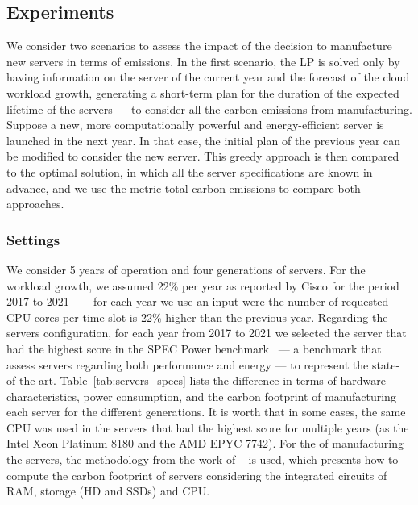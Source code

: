 \subsection{Experiments}


We consider two scenarios to assess the impact of the decision to manufacture new servers in terms of  emissions. In the first scenario, the LP is solved only by having information on the server of the current year and the forecast of the cloud workload growth, generating a short-term plan for the duration of the expected lifetime of the servers --- to consider all the carbon emissions from manufacturing. Suppose a new, more computationally powerful and energy-efficient server is launched in the next year. In that case, the initial plan of the previous year can be modified to consider the new server. This greedy approach is then compared to the optimal solution, in which all the server specifications are known in advance, and we use the metric total carbon emissions to compare both approaches.



\subsubsection{Settings}


We consider 5 years of operation and four generations of servers. For the workload growth, we assumed 22\% per year as reported by Cisco for the period 2017 to 2021~\cite{cisco_global_cloud_index_2018} --- for each year we use an input were the number of requested CPU cores per time slot is 22\% higher than the previous year. Regarding the servers configuration, for each year from 2017 to 2021 we selected the server that had the highest score in the SPEC Power benchmark~\cite{spec_power} --- a benchmark that assess servers regarding both performance and energy --- to represent the state-of-the-art. Table~\ref{tab:servers_specs} lists the difference in terms of hardware characteristics, power consumption, and the carbon footprint of manufacturing each server for the different generations.  It is worth  that in some cases, the same CPU was used in the servers that had the highest score for multiple years (as the Intel Xeon Platinum 8180 and the AMD EPYC 7742). For the  of manufacturing the servers, the methodology from the work of ~\citet{gupta2022_ACT} is used, which presents how to compute the carbon footprint of servers considering the integrated circuits of  RAM, storage (HD and SSDs) and CPU.



